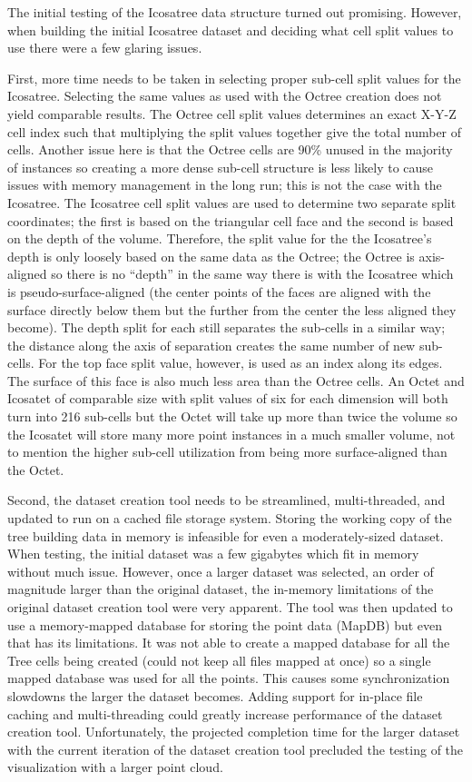 The initial testing of the Icosatree data structure turned out promising.
However, when building the initial Icosatree dataset and deciding what cell
split values to use there were a few glaring issues.

First, more time needs to be taken in selecting proper sub-cell split values for
the Icosatree. Selecting the same values as used with the Octree creation does
not yield comparable results. The Octree cell split values determines an exact
X-Y-Z cell index such that multiplying the split values together give the total
number of cells. Another issue here is that the Octree cells are 90\% unused in
the majority of instances so creating a more dense sub-cell structure is less
likely to cause issues with memory management in the long run; this is not the
case with the Icosatree. The Icosatree cell split values are used to determine
two separate split coordinates; the first is based on the triangular cell face
and the second is based on the depth of the volume. Therefore, the split value
for the the Icosatree’s depth is only loosely based on the same data as the
Octree; the Octree is axis-aligned so there is no “depth” in the same way there
is with the Icosatree which is pseudo-surface-aligned (the center points of the
faces are aligned with the surface directly below them but the further from the
center the less aligned they become). The depth split for each still separates
the sub-cells in a similar way; the distance along the axis of separation
creates the same number of new sub-cells. For the top face split value, however,
is used as an index along its edges. The surface of this face is also much less
area than the Octree cells. An Octet and Icosatet of comparable size with split
values of six for each dimension will both turn into 216 sub-cells but the Octet
will take up more than twice the volume so the Icosatet will store many more
point instances in a much smaller volume, not to mention the higher sub-cell
utilization from being more surface-aligned than the Octet.

Second, the dataset creation tool needs to be streamlined, multi-threaded, and
updated to run on a cached file storage system. Storing the working copy of the
tree building data in memory is infeasible for even a moderately-sized dataset.
When testing, the initial dataset was a few gigabytes which fit in memory
without much issue. However, once a larger dataset was selected, an order of
magnitude larger than the original dataset, the in-memory limitations of the
original dataset creation tool were very apparent. The tool was then updated to
use a memory-mapped database for storing the point data (MapDB) but even that
has its limitations. It was not able to create a mapped database for all the
Tree cells being created (could not keep all files mapped at once) so a single
mapped database was used for all the points. This causes some synchronization
slowdowns the larger the dataset becomes. Adding support for in-place file
caching and multi-threading could greatly increase performance of the dataset
creation tool. Unfortunately, the projected completion time for the larger
dataset with the current iteration of the dataset creation tool precluded the
testing of the visualization with a larger point cloud.


